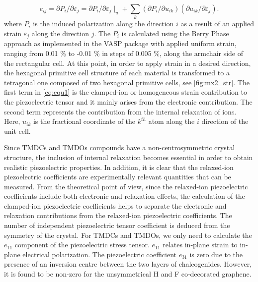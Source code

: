 \begin{equation}
e_{ij}=\partial P_{i}/\partial\varepsilon_{j}=\partial P_{i}/\partial\varepsilon_{j}\mid_u+\sum_k (\partial P_{i}/\partial u_{ik})(\partial u_{ik}/\partial\varepsilon_{j}). \label{eq:equ1}
\end{equation}
where $P_i$ is the induced polarization along the direction $i$ as a result of an applied strain $\varepsilon_{j}$ along the direction $j$. 
The $P_i$ is calculated using the Berry Phase approach\cite{vanderbilt2000} as implemented in the VASP package with applied uniform strain, ranging from 0.01 \% to -0.01 \% in steps of 0.005 \%, along the armchair side of the rectangular cell. At this point, in order to apply strain in a desired direction, the hexagonal primitive cell structure of each material is transformed to a tetragonal one composed of two hexagonal primitive cells\cite{Duerloo2012}, see \autoref{fig:mx2_str}. The first term in \autoref{eq:equ1} is the clamped-ion or homogeneous strain contribution to the piezoelectric tensor and it mainly arises from the electronic contribution. The second term represents the contribution from the internal relaxation of ions. Here, $u_{ik}$ is the fractional coordinate of the $k^{th}$ atom along the $i$ direction of the unit cell. 

Since TMDCs and TMDOs compounds have a non-centrosymmetric crystal structure, the inclusion of internal relaxation becomes essential in order to obtain realistic piezoelectric properties. In addition, it is clear that the relaxed-ion piezoelectric coefficients are experimentally relevant quantities that can be measured. From the theoretical point of view, since the relaxed-ion piezoelectric coefficients include both electronic and relaxation effects, the calculation of the clamped-ion piezoelectric coefficients helps to separate the electronic and relaxation contributions from the relaxed-ion piezoelectric coefficients. The number of independent piezoelectric tensor coefficient is deduced from the symmetry of the crystal. For TMDCs and TMDOs, we only need to calculate the $e_{11}$ component of the piezoelectric stress tensor. $e_{11}$ relates in-plane strain to in-plane electrical polarization. The piezoelectric coefficient $e_{31}$ is zero due to the presence of an inversion centre between the two layers of chalcogenides. However, it is found to be non-zero for the unsymmetrical H and F co-decorated graphene\cite{Ong2013,KIM201462}. 


